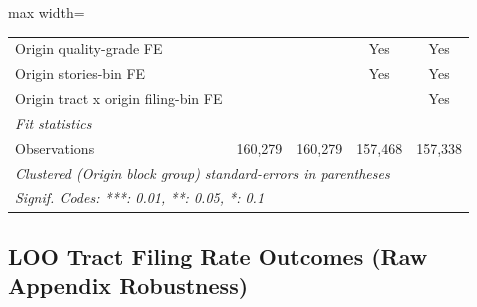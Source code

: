 \documentclass[
  11pt,
]{article}
\begin{document}
\begin{adjustbox}{max width=\textwidth}
\begin{tabular}{lcccc}
   Origin quality-grade FE                         &                &                & Yes            & Yes\\  
   Origin stories-bin FE                           &                &                & Yes            & Yes\\  
   Origin tract x origin filing-bin FE             &                &                &                & Yes\\  
   \midrule
   \emph{Fit statistics}\\
   Observations                                    & 160,279        & 160,279        & 157,468        & 157,338\\  
   \midrule \midrule
   \multicolumn{5}{l}{\emph{Clustered (Origin block group) standard-errors in parentheses}}\\
   \multicolumn{5}{l}{\emph{Signif. Codes: ***: 0.01, **: 0.05, *: 0.1}}\\
\end{tabular}
\par\endgroup

\end{adjustbox}

\subsection{LOO Tract Filing Rate Outcomes (Raw Appendix
Robustness)}\label{loo-tract-filing-rate-outcomes-raw-appendix-robustness}
\end{document}
